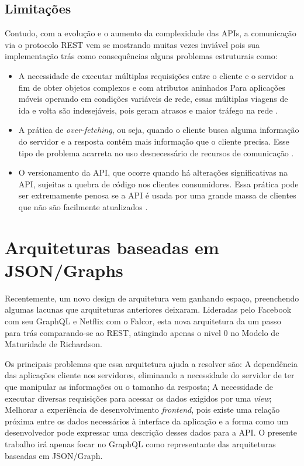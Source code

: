\subsection{Limitações}

Contudo, com a evolução e o aumento da complexidade das APIs, a comunicação via o protocolo REST vem se mostrando muitas vezes inviável pois sua implementação trás como consequências alguns problemas estruturais como:

\begin{itemize}

\item A necessidade de executar múltiplas requisições entre o cliente e o servidor a fim de obter objetos complexos e com atributos aninhados  Para aplicações móveis operando em condições variáveis de rede, essas múltiplas viagens de ida e volta são indesejáveis, pois geram atrasos e maior tráfego na rede \cite{graph-intro}.

\item A prática de \textit{over-fetching}, ou seja, quando o cliente busca alguma informação do servidor e a resposta contém mais informação que o cliente precisa. Esse tipo de problema acarreta no uso desnecessário de recursos de comunicação  \cite{efficient-data-communication}.

\item O versionamento da API, que ocorre quando há alterações significativas na API, sujeitas a quebra de código nos clientes consumidores. Essa prática pode ser extremamente penosa se a API é usada por uma grande massa de clientes que não são facilmente atualizados \cite{api-versioning}.

\end{itemize}

\section{Arquiteturas baseadas em JSON/Graphs}\label{sec:graph}

Recentemente, um novo design de arquitetura vem ganhando espaço, preenchendo algumas lacunas que arquiteturas anteriores deixaram. Lideradas pelo Facebook com seu GraphQL e Netflix com o Falcor, esta nova arquitetura da um passo para trás comparando-se ao REST, atingindo apenas o nivel 0 no Modelo de Maturidade de Richardson. 

Os principais problemas que essa arquitetura ajuda a resolver são: A dependência das aplicações cliente nos servidores, eliminando a necessidade do servidor de ter que manipular as informações ou o tamanho da resposta; A necessidade de executar diversas requisições para acessar os dados exigidos por uma \textit{view}; Melhorar a experiência de desenvolvimento \textit{frontend}, pois existe uma relação próxima entre os dados necessários à interface da aplicação e a forma como um desenvolvedor pode expressar uma descrição desses dados para a API. O presente trabalho irá apenas focar no GraphQL como representante das arquiteturas baseadas em JSON/Graph.

